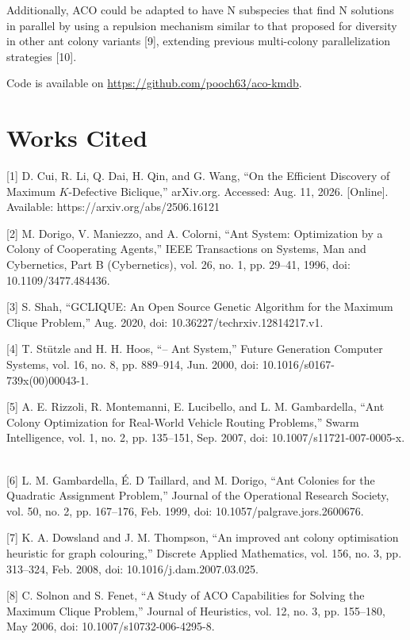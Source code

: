 \documentclass{article}
\begin{document}
Additionally, ACO could be adapted to have N subspecies that find N solutions in parallel by using a repulsion mechanism similar to that proposed for diversity in other ant colony variants [9], extending previous multi-colony parallelization strategies [10].



Code is available on \url{https://github.com/pooch63/aco-kmdb}.

\section{Works Cited}

[1] D. Cui, R. Li, Q. Dai, H. Qin, and G. Wang, “On the Efficient Discovery of Maximum $K$-Defective Biclique,” arXiv.org. Accessed: Aug. 11, 2026. [Online]. Available: https://arxiv.org/abs/2506.16121
\

[2]
M. Dorigo, V. Maniezzo, and A. Colorni, “Ant System: Optimization by a Colony of Cooperating Agents,” IEEE Transactions on Systems, Man and Cybernetics, Part B (Cybernetics), vol. 26, no. 1, pp. 29–41, 1996, doi: 10.1109/3477.484436.
\

[3]
S. Shah, “GCLIQUE: An Open Source Genetic Algorithm for the Maximum Clique Problem,” Aug. 2020, doi: 10.36227/techrxiv.12814217.v1.
\

[4]
T. Stützle and H. H. Hoos, “– Ant System,” Future Generation Computer Systems, vol. 16, no. 8, pp. 889–914, Jun. 2000, doi: 10.1016/s0167-739x(00)00043-1.
\

[5]
A. E. Rizzoli, R. Montemanni, E. Lucibello, and L. M. Gambardella, “Ant Colony Optimization for Real-World Vehicle Routing Problems,” Swarm Intelligence, vol. 1, no. 2, pp. 135–151, Sep. 2007, doi: 10.1007/s11721-007-0005-x.
\

[6]
L. M. Gambardella, É. D Taillard, and M. Dorigo, “Ant Colonies for the Quadratic Assignment Problem,” Journal of the Operational Research Society, vol. 50, no. 2, pp. 167–176, Feb. 1999, doi: 10.1057/palgrave.jors.2600676.
\

[7]
K. A. Dowsland and J. M. Thompson, “An improved ant colony optimisation heuristic for graph colouring,” Discrete Applied Mathematics, vol. 156, no. 3, pp. 313–324, Feb. 2008, doi: 10.1016/j.dam.2007.03.025.
\

[8]
C. Solnon and S. Fenet, “A Study of ACO Capabilities for Solving the Maximum Clique Problem,” Journal of Heuristics, vol. 12, no. 3, pp. 155–180, May 2006, doi: 10.1007/s10732-006-4295-8.
\
\end{document}
